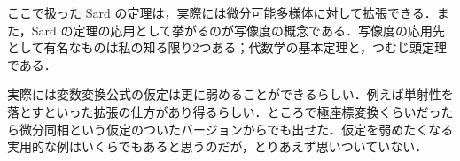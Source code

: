 \begin{que}[**]
ここで扱った Sard の定理は，実際には微分可能多様体に対して拡張できる．また，Sard の定理の応用として挙がるのが写像度の概念である．写像度の応用先として有名なものは私の知る限り2つある；代数学の基本定理と，つむじ頭定理である．
\end{que}

\begin{que}[*]
実際には変数変換公式の仮定は更に弱めることができるらしい．例えば単射性を落とすといった拡張の仕方があり得るらしい．ところで極座標変換くらいだったら微分同相という仮定のついたバージョンからでも出せた．仮定を弱めたくなる実用的な例はいくらでもあると思うのだが，とりあえず思いついていない．
\end{que}

